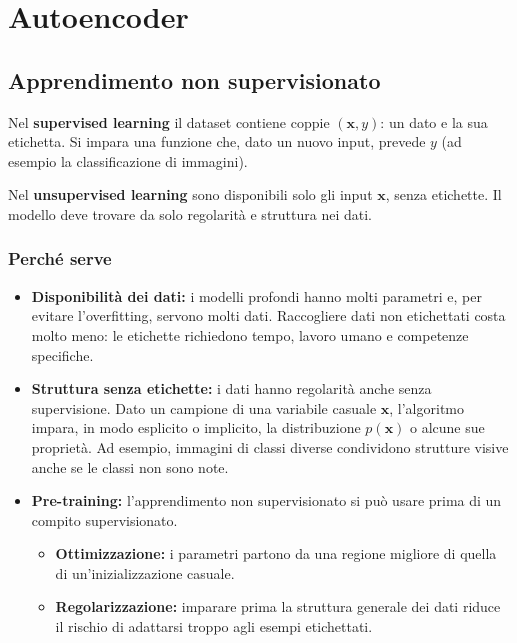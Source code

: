 \documentclass[11pt,a4paper]{article}
\begin{document}
\section{Autoencoder}

\subsection{Apprendimento non supervisionato}

Nel \textbf{supervised learning} il dataset contiene coppie $(\mathbf{x},y)$:
un dato e la sua etichetta. Si impara una funzione che, dato un nuovo input,
prevede $y$ (ad esempio la classificazione di immagini).

Nel \textbf{unsupervised learning} sono disponibili solo gli input
$\mathbf{x}$, senza etichette. Il modello deve trovare da solo regolarità e
struttura nei dati.

\subsubsection{Perché serve}
\begin{itemize}
  \item \textbf{Disponibilità dei dati:} i modelli profondi hanno molti
        parametri e, per evitare l'overfitting, servono molti dati. Raccogliere
        dati non etichettati costa molto meno: le etichette richiedono tempo,
        lavoro umano e competenze specifiche.
  \item \textbf{Struttura senza etichette:} i dati hanno regolarità anche senza
        supervisione. Dato un campione di una variabile casuale $\mathbf{x}$,
        l'algoritmo impara, in modo esplicito o implicito, la distribuzione
        $p(\mathbf{x})$ o alcune sue proprietà. Ad esempio, immagini di classi
        diverse condividono strutture visive anche se le classi non sono note.
  \item \textbf{Pre-training:} l'apprendimento non supervisionato si può usare
        prima di un compito supervisionato.
  \begin{itemize}
    \item \textbf{Ottimizzazione:} i parametri partono da una regione migliore
          di quella di un'inizializzazione casuale.
    \item \textbf{Regolarizzazione:} imparare prima la struttura generale dei
          dati riduce il rischio di adattarsi troppo agli esempi etichettati.
  \end{itemize}
\end{itemize}
\end{document}

